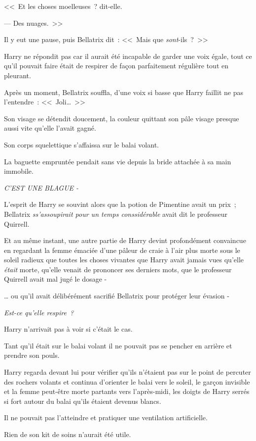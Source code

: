 <<~Et les choses moelleuses~? dit-elle.

--- Des nuages.~>>

Il y eut une pause, puis Bellatrix dit~: <<~Mais que \emph{sont}-ils~?~>>

Harry ne répondit pas car il aurait été incapable de garder une voix égale, tout ce qu'il pouvait faire était de respirer de façon parfaitement régulière tout en pleurant.

Après un moment, Bellatrix souffla, d'une voix si basse que Harry faillit ne pas l'entendre~: <<~Joli…~>>

Son visage se détendit doucement, la couleur quittant son pâle visage presque aussi vite qu'elle l'avait gagné.

Son corps squelettique s'affaissa sur le balai volant.

La baguette empruntée pendait sans vie depuis la bride attachée à sa main immobile.

\emph{C'EST UNE BLAGUE -}

L'esprit de Harry se souvint alors que la potion de Pimentine avait un prix~; Bellatrix \emph{ss'assoupirait pour un temps conssidérable} avait dit le professeur Quirrell.

Et au même instant, une autre partie de Harry devint profondément convaincue en regardant la femme émaciée d'une pâleur de craie à l'air plus morte sous le soleil radieux que toutes les choses vivantes que Harry avait jamais vues qu'elle \emph{était} morte, qu'elle venait de prononcer ses derniers mots, que le professeur Quirrell avait mal jugé le dosage -

… ou qu'il avait délibérément sacrifié Bellatrix pour protéger leur évasion -

\emph{Est-ce qu'elle respire~?}

Harry n'arrivait pas à voir si c'était le cas.

Tant qu'il était sur le balai volant il ne pouvait pas se pencher en arrière et prendre son pouls.

Harry regarda devant lui pour vérifier qu'ils n'étaient pas sur le point de percuter des rochers volants et continua d'orienter le balai vers le soleil, le garçon invisible et la femme peut-être morte partants vers l'après-midi, les doigts de Harry serrés si fort autour du balai qu'ils étaient devenus blancs.

Il ne pouvait pas l'atteindre et pratiquer une ventilation artificielle.

Rien de son kit de soins n'aurait été utile.

